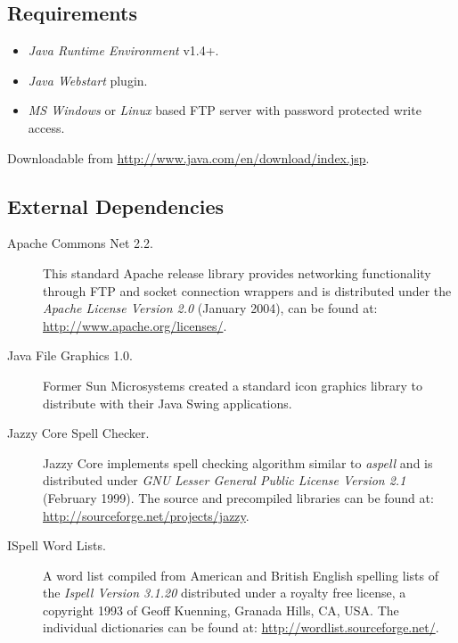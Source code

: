 \documentclass[a4paper,11pt,oneside]{article}
\begin{document}
\subsection{Requirements}
\begin{itemize}
 \item \emph{Java Runtime Environment} v1.4+.
 \item \emph{Java Webstart} plugin.
 \item \emph{MS Windows} or \emph{Linux} based FTP server with password protected write access.
\end{itemize}
Downloadable from \url{http://www.java.com/en/download/index.jsp}.

\subsection{External Dependencies}

\begin{description}
	\item[Apache Commons Net 2.2.] This standard Apache release library provides networking functionality through FTP and socket connection wrappers and is distributed under the \emph{Apache License Version 2.0} (January 2004), can be found at: \url{http://www.apache.org/licenses/}.
	
	\item[Java File Graphics 1.0.] Former Sun Microsystems created a standard icon graphics library to distribute with their Java Swing applications.
	
	\item[Jazzy Core Spell Checker.] Jazzy Core implements spell checking algorithm similar to \emph{aspell} and is distributed under \emph{GNU Lesser General Public License Version 2.1} (February 1999). The source and precompiled libraries can be found at: \url{http://sourceforge.net/projects/jazzy}.
	
	\item[ISpell Word Lists.] A word list compiled from American and British English spelling lists of the \emph{Ispell Version 3.1.20} distributed under a royalty free license, a copyright 1993 of Geoff Kuenning, Granada Hills, CA, USA. The individual dictionaries can be found at: \url{http://wordlist.sourceforge.net/}.
\end{description}
\end{document}
